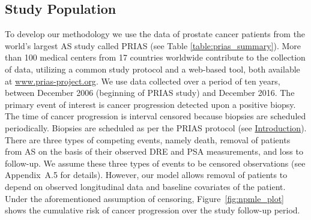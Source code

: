 
\subsection{Study Population}
\label{subsec:study_population}
To develop our methodology we use the data of prostate cancer patients from the world's largest AS study called PRIAS \cite{bokhorst2016decade} (see Table \ref{table:prias_summary}). More than 100 medical centers from 17 countries worldwide contribute to the collection of data, utilizing a common study protocol and a web-based tool, both available at \url{www.prias-project.org}. We use data collected over a period of ten years, between December 2006 (beginning of PRIAS study) and December 2016. The primary event of interest is cancer progression detected upon a positive biopsy. The time of cancer progression is interval censored because biopsies are scheduled periodically. Biopsies are scheduled as per the PRIAS protocol (see \hyperref[sec:introduction]{Introduction}). There are three types of competing events, namely death, removal of patients from AS on the basis of their observed DRE and PSA measurements, and loss to follow-up. We assume these three types of events to be censored observations (see Appendix~A.5 for details). However, our model allows removal of patients to depend on observed longitudinal data and baseline covariates of the patient. Under the aforementioned assumption of censoring, Figure~\ref{fig:npmle_plot} shows the cumulative risk of cancer progression over the study follow-up period.

